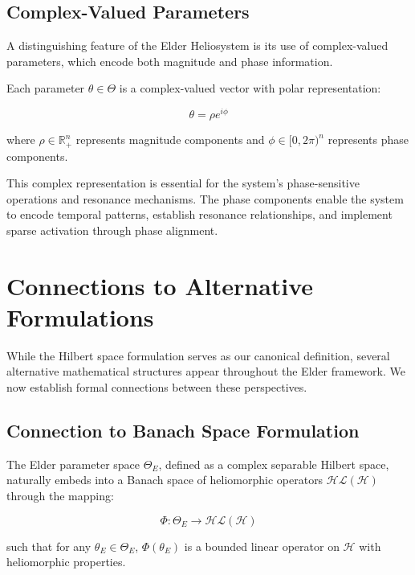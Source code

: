 \subsection{Complex-Valued Parameters}

A distinguishing feature of the Elder Heliosystem is its use of complex-valued parameters, which encode both magnitude and phase information.

\begin{definition}
Each parameter $\theta \in \Theta$ is a complex-valued vector with polar representation:

\begin{equation}
\theta = \rho e^{i\phi}
\end{equation}

where $\rho \in \mathbb{R}^n_+$ represents magnitude components and $\phi \in [0, 2\pi)^n$ represents phase components.
\end{definition}

This complex representation is essential for the system's phase-sensitive operations and resonance mechanisms. The phase components enable the system to encode temporal patterns, establish resonance relationships, and implement sparse activation through phase alignment.

\section{Connections to Alternative Formulations}

While the Hilbert space formulation serves as our canonical definition, several alternative mathematical structures appear throughout the Elder framework. We now establish formal connections between these perspectives.

\subsection{Connection to Banach Space Formulation}

\begin{theorem}
The Elder parameter space $\Theta_E$, defined as a complex separable Hilbert space, naturally embeds into a Banach space of heliomorphic operators $\mathcal{HL}(\mathcal{H})$ through the mapping:

\begin{equation}
\Phi: \Theta_E \to \mathcal{HL}(\mathcal{H})
\end{equation}

such that for any $\theta_E \in \Theta_E$, $\Phi(\theta_E)$ is a bounded linear operator on $\mathcal{H}$ with heliomorphic properties.
\end{theorem}

